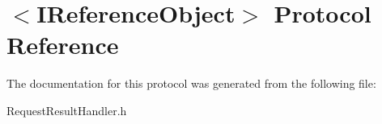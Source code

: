 \hypertarget{protocol_i_reference_object-p}{}\section{$<$I\+Reference\+Object$>$ Protocol Reference}
\label{protocol_i_reference_object-p}


The documentation for this protocol was generated from the following file\+:\begin{DoxyCompactItemize}
\item 
Request\+Result\+Handler.\+h\end{DoxyCompactItemize}
